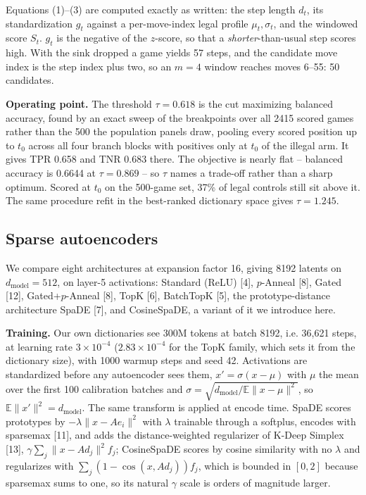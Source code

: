 Equations (1)--(3) are computed exactly as written: the step length $d_t$, its standardization
$g_t$ against a per-move-index legal profile $\mu_t, \sigma_t$, and the windowed score $S_t$.
$g_t$ is the negative of the $z$-score, so that a \emph{shorter}-than-usual step scores high. With
the sink dropped a game yields 57 steps, and the candidate move index is the step index plus two,
so an $m = 4$ window reaches moves 6--55: 50 candidates.

\textbf{Operating point.} The threshold $\tau = 0.618$ is the cut maximizing balanced accuracy,
found by an exact sweep of the breakpoints over all 2415 scored games rather than the 500 the
population panels draw, pooling every
scored position up to $t_0$ across all four branch blocks with positives only at $t_0$ of the
illegal arm. It gives TPR 0.658 and TNR 0.683 there. The objective is nearly flat -- balanced accuracy is
0.6644 at $\tau = 0.869$ -- so $\tau$ names a trade-off rather than a sharp optimum. Scored at
$t_0$ on the 500-game set, 37\% of legal controls still sit above it. The same procedure refit in the best-ranked dictionary space
gives $\tau = 1.245$.

\subsection{Sparse autoencoders}

We compare eight architectures at expansion factor 16, giving 8192 latents on
$d_{\mathrm{model}} = 512$, on layer-5 activations: Standard (ReLU) [4], $p$-Anneal [8], Gated [12],
Gated+$p$-Anneal [8], TopK [6], BatchTopK [5], the prototype-distance architecture SpaDE [7],
and CosineSpaDE, a variant of it we introduce here.

\textbf{Training.} Our own dictionaries see 300M tokens at batch 8192, i.e. 36,621 steps, at
learning rate $3\times10^{-4}$ ($2.83\times10^{-4}$ for the TopK family, which sets it from the
dictionary size), with 1000 warmup steps and seed 42. Activations are standardized before any autoencoder sees
them, $x' = \sigma (x - \mu)$ with $\mu$ the mean over the first 100 calibration batches and
$\sigma = \sqrt{d_{\mathrm{model}} / \mathbb{E}\|x - \mu\|^2}$, so $\mathbb{E}\|x'\|^2 = d_{\mathrm{model}}$. The same transform is applied at encode time. SpaDE scores prototypes by
$-\lambda\|x - Ae_i\|^2$ with $\lambda$ trainable through a softplus, encodes with sparsemax [11],
and adds the distance-weighted regularizer of K-Deep Simplex [13],
$\gamma \sum_j \|x - Ad_j\|^2 f_j$; CosineSpaDE scores
by cosine similarity with no $\lambda$ and regularizes with $\sum_j (1 - \cos(x, Ad_j)) f_j$,
which is bounded in $[0, 2]$ because sparsemax sums to one, so its natural $\gamma$ scale is
orders of magnitude larger.

